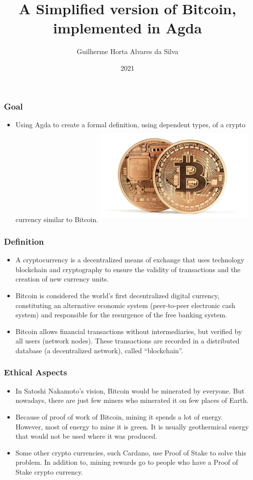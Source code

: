 \documentclass{beamer}
\title{A Simplified version of Bitcoin, \\
    implemented in Agda}
\author[Guilherme]{Guilherme Horta Alvares da Silva}
\date{2021}
\begin{document}
\frame{\titlepage}

\begin{frame}
\frametitle{Goal}
\begin{itemize}
  \item Using Agda to create a formal definition, using dependent types, of a crypto currency similar to Bitcoin.
    \includegraphics[width=8cm, height=5cm]{TwoBitcoins}
\end{itemize}
\end{frame}

\begin{frame}
   \frametitle{Definition}
\begin{itemize}
     \item A cryptocurrency is a decentralized means of exchange that uses technology
       blockchain and cryptography to ensure the validity of transactions and the creation of new currency units.
     \item Bitcoin is considered the world's first decentralized digital currency,
       constituting an alternative economic system (peer-to-peer electronic cash system)
       and responsible for the resurgence of the free banking system.
       \cite{nakamoto2008bitcoin}
     \item Bitcoin allows financial transactions without intermediaries,
       but verified by all users (network nodes).
       These transactions are recorded in a distributed database (a decentralized network),
       called \foreignquote{english}{blockchain}.
     \end{itemize}
\end{frame}

\begin{frame}
   \frametitle{Ethical Aspects}
\begin{itemize}
  \item In Satoshi Nakamoto's vision, Bitcoin would be minerated by everyone.
    But nowadays, there are just few miners who minerated it on few places of Earth.
  \item Because of proof of work of Bitcoin, mining it spends a lot of energy.
    However, most of energy to mine it is green. It is usually geothermical energy
    that would not be used where it was produced.
  \item Some other crypto currencies, such Cardano, use Proof of Stake to solve this
  problem. In addition to, mining rewards go to people who have a Proof of Stake crypto currency.
\end{itemize}
\end{frame}
\end{document}
